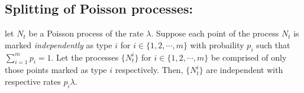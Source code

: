 \documentclass[a4paper,10pt,english]{article}
\begin{document}
\subsection*{Splitting of Poisson processes:}
let $N_t$ be a Poisson process of the rate $\lambda$. Suppose each point of the process $N_t$ is marked \textit{independently} as type $i$ for $i \in \{1,2,\cdots,m\}$ with probaility $p_i$ such that $\sum_{i=1}^m p_i = 1$. Let the processes $\{N_t^{i}\}$ for $i \in \{1,2,\cdots,m\}$ be comprised of only those points marked as type $i$ respectively. Then,  $\{N_t^{i}\}$ are independent with respective rates $p_i \lambda$.
\end{document}
